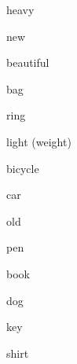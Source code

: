 

\begin{flashcard}{\LARGE heavy}
\LARGE {}
\end{flashcard}
\begin{flashcard}{\LARGE new}
\LARGE {}
\end{flashcard}
\begin{flashcard}{\LARGE beautiful}
\LARGE {}
\end{flashcard}
\begin{flashcard}{\LARGE bag}
\LARGE {}
\end{flashcard}
\begin{flashcard}{\LARGE ring}
\LARGE {}
\end{flashcard}
\begin{flashcard}{\LARGE light (weight)}
\LARGE {}
\end{flashcard}
\begin{flashcard}{\LARGE bicycle}
\LARGE {}
\end{flashcard}
\begin{flashcard}{\LARGE car}
\LARGE {}
\end{flashcard}
\begin{flashcard}{\LARGE old}
\LARGE {}
\end{flashcard}
\begin{flashcard}{\LARGE pen}
\LARGE {}
\end{flashcard}
\begin{flashcard}{\LARGE book}
\LARGE {}
\end{flashcard}
\begin{flashcard}{\LARGE dog}
\LARGE {}
\end{flashcard}
\begin{flashcard}{\LARGE key}
\LARGE {}
\end{flashcard}
\begin{flashcard}{\LARGE shirt}
\LARGE {}
\end{flashcard}
